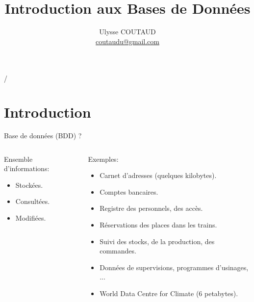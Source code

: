 \documentclass[xetex,dvipsnames]{beamer}
\begin{document}
\title{Introduction aux Bases de Données}

 {   \hspace{1em} \insertframenumber/\inserttotalframenumber }


\author{Ulysse COUTAUD\\\href{mailto:coutaudu@gmail.com}{\small coutaudu@gmail.com}}
\date{}
	
\maketitle

\section{Introduction}

\begin{frame}{Base de données (BDD) ?}
    \begin{columns}
	    \begin{column}{0.5\textwidth}
	    Ensemble d'informations:
		 	\begin{itemize}
		 		\item Stockées.
		 		\item Consultées.
		 		\item Modifiées.
		 	\end{itemize}
		\end{column}
		\begin{column}{0.5\textwidth}
\begin{footnotesize}
		Exemples:
			\begin{itemize}
		 		\item Carnet d'adresses (quelques kilobytes).
		 		\item Comptes bancaires.
		 		\item Registre des personnels, des accès.
		 		\item Réservations des places dans les trains.
		 		\item Suivi des stocks, de la production, des commandes.
		 		\item Données de supervisions, programmes d'usinages, ...
		 		\item World Data Centre for Climate (6 petabytes).
		 	\end{itemize}
\end{footnotesize}
		\end{column}
	\end{columns}
		
\end{frame}
\end{document}
